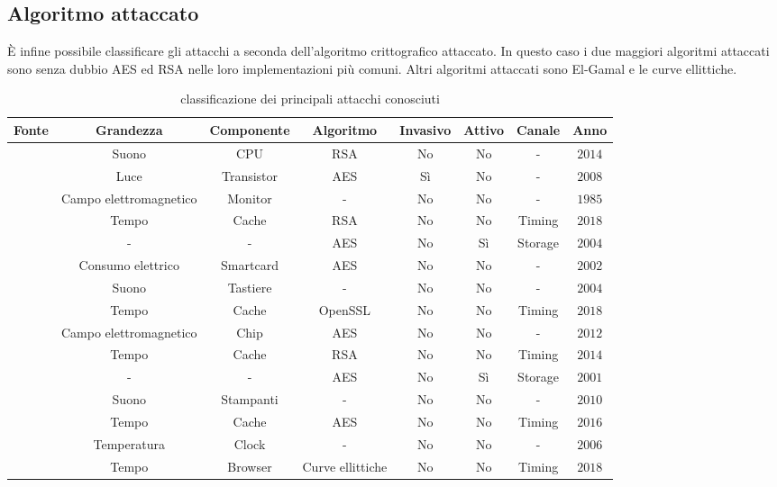 		\subsection*{Algoritmo attaccato}		
			È infine possibile classificare gli attacchi a seconda dell'algoritmo crittografico attaccato. In questo caso i due maggiori algoritmi attaccati sono senza dubbio \ac{AES}\cite{standard2001announcing} ed RSA\cite{rivest1978method} nelle loro implementazioni più comuni. Altri algoritmi attaccati sono El-Gamal\cite{elgamal1985public} e le curve ellittiche\cite{koblitz1987elliptic,miller1985use}.
			\begin{table}[]
				\scriptsize
				\centering
				\begin{tabular}{|c|c|c|c|c|c|c|c|} \hline
					Fonte						& Grandezza					& Componente	& Algoritmo			& Invasivo	& Attivo	& Canale	& Anno		\\ \hline \hline
					\cite{genkin2014rsa}		& Suono						& CPU			& RSA				& No		& No		& -			& $2014$	\\ \hline
					\cite{ferrigno2008aes}		& Luce						& Transistor	& AES				& Sì		& No		& -			& $2008$	\\ \hline
					\cite{van1985electromagn}	& Campo elettromagnetico	& Monitor    	& -					& No		& No		& -			& $1985$	\\ \hline
					\cite{kocher2018spectre}	& Tempo						& Cache			& RSA				& No		& No		& Timing	& $2018$	\\ \hline
					\cite{giraud2004dfa}		& -							& -				& AES				& No		& Sì		& Storage	& $2004$	\\ \hline
					\cite{mangard2002simple}	& Consumo elettrico			& Smartcard		& AES				& No		& No		& -			& $2002$	\\ \hline
					\cite{asonov2004keyboard}	& Suono						& Tastiere		& -					& No		& No		& -			& $2004$	\\ \hline
					\cite{zhou2018efficient}	& Tempo						& Cache			& OpenSSL			& No		& No		& Timing	& $2018$	\\ \hline
					\cite{martinasek2012simple}	& Campo elettromagnetico	& Chip			& AES				& No		& No		& -			& $2012$	\\ \hline
					\cite{yarom2014flush+}		& Tempo						& Cache			& RSA				& No		& No		& Timing	& $2014$	\\ \hline
					\cite{karri2001fault}		& -							& -				& AES				& No		& Sì		& Storage	& $2001$	\\ \hline
					\cite{backes2010acoustic}	& Suono						& Stampanti		& -					& No		& No		& -			& $2010$	\\ \hline
					\cite{lipp2016armageddon}	& Tempo						& Cache			& AES				& No		& No		& Timing	& $2016$	\\ \hline
					\cite{murdoch2006hot}		& Temperatura				& Clock			& -					& No		& No		& -			& $2006$	\\ \hline
					\cite{genkin2018drive}		& Tempo						& Browser		& Curve ellittiche	& No		& No		& Timing	& $2018$	\\ \hline
				\end{tabular}
				\caption{classificazione dei principali attacchi conosciuti}
				\label{tab:attacchi}
			\end{table}
